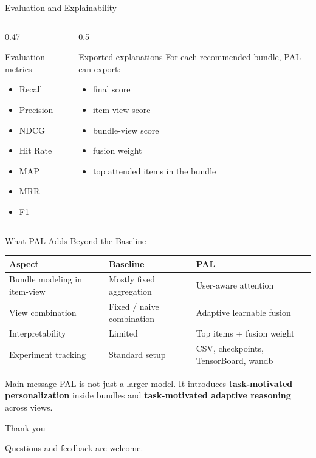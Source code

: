 \documentclass[aspectratio=169]{beamer}
\begin{document}
\begin{frame}{Evaluation and Explainability}
  \begin{columns}[T]
    \begin{column}{0.47\textwidth}
      \begin{block}{Evaluation metrics}
        \begin{itemize}
          \item Recall
          \item Precision
          \item NDCG
          \item Hit Rate
          \item MAP
          \item MRR
          \item F1
        \end{itemize}
      \end{block}
    \end{column}
    \begin{column}{0.5\textwidth}
      \begin{block}{Exported explanations}
        For each recommended bundle, PAL can export:
        \begin{itemize}
          \item final score
          \item item-view score
          \item bundle-view score
          \item fusion weight
          \item top attended items in the bundle
        \end{itemize}
      \end{block}
    \end{column}
  \end{columns}
\end{frame}

\begin{frame}{What PAL Adds Beyond the Baseline}
  \centering
  \begin{tabular}{>{\raggedright\arraybackslash}p{} >{\raggedright\arraybackslash}p{} >{\raggedright\arraybackslash}p{}}
    \toprule
    Aspect & Baseline & PAL \\
    \midrule
    Bundle modeling in item-view & Mostly fixed aggregation & User-aware attention \\
    View combination & Fixed / naive combination & Adaptive learnable fusion \\
    Interpretability & Limited & Top items + fusion weight \\
    Experiment tracking & Standard setup & CSV, checkpoints, TensorBoard, wandb \\
    \bottomrule
  \end{tabular}

  \vspace{0.9em}
  \begin{block}{Main message}
    PAL is not just a larger model. It introduces \textbf{task-motivated personalization}
    inside bundles and \textbf{task-motivated adaptive reasoning} across views.
  \end{block}
\end{frame}

\begin{frame}
  \centering
  {\LARGE Thank you}

  \vspace{0.9em}
  {\large Questions and feedback are welcome.}
\end{frame}
\end{document}
